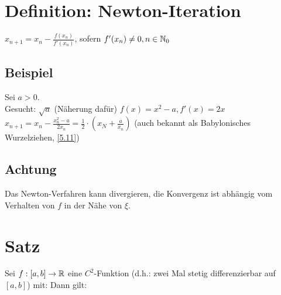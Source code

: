 \newpage

{}
\section*{Definition: Newton-Iteration}
$x_{n+1}=x_n-\frac{f(x_n)}{f'(x_n)}$, sofern $f'(x_n) \neq 0, n \in \mathbb{N}_0$

\subsection*{Beispiel}
Sei $a>0$.\\
Gesucht: $\sqrt{a}$ (Näherung dafür)\nl
$f(x)=x^2-a, f'(x)=2x$\\
$x_{n+1}=x_n-\frac{x_n^2-a}{2x_n} = \frac{1}{2} \cdot \left(x_N + \frac{a}{x_n}\right)$ (auch bekannt als Babylonisches Wurzelziehen, \ref{5.11})

\subsection*{Achtung}
Das Newton-Verfahren kann divergieren, die Konvergenz ist abhängig vom Verhalten von $f$ in der Nähe von $\xi$.

\section{Satz}\label{16.1}
Sei $f: [a,b] \to \mathbb{R}$ eine $C^2$-Funktion (d.h.: zwei Mal stetig differenzierbar auf $[a,b]$) mit:
Dann gilt:

